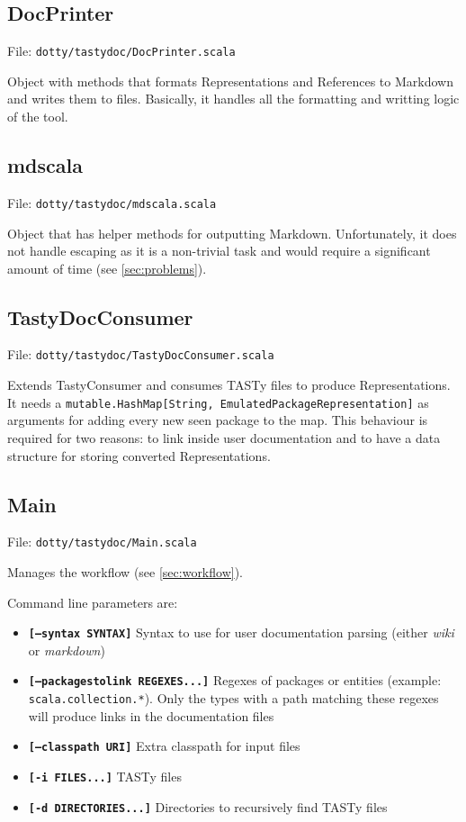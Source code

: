 \documentclass{report}
\begin{document}
\subsection{DocPrinter}
File: \texttt{dotty/tastydoc/DocPrinter.scala}

Object with methods that formats Representations and References to Markdown and writes them to files. Basically, it handles all the formatting and writting logic of the tool.

\subsection{mdscala}
File: \texttt{dotty/tastydoc/mdscala.scala}

Object that has helper methods for outputting Markdown. Unfortunately, it does not handle escaping as it is a non-trivial task and would require a significant amount of time (see \autoref{sec:problems}).

\subsection{TastyDocConsumer}
File: \texttt{dotty/tastydoc/TastyDocConsumer.scala}

Extends TastyConsumer and consumes TASTy files to produce Representations. It needs a \texttt{mutable.HashMap[String, EmulatedPackageRepresentation]} as arguments for adding every new seen package to the map. This behaviour is required for two reasons: to link inside user documentation and to have a data structure for storing converted Representations.
\subsection{Main}
File: \texttt{dotty/tastydoc/Main.scala}

Manages the workflow (see \autoref{sec:workflow}).

Command line parameters are:
\begin{itemize}
    \item \textbf{\texttt{[--syntax SYNTAX]}} Syntax to use for user documentation parsing (either \textit{wiki} or \textit{markdown})
    \item \textbf{\texttt{[--packagestolink REGEXES...]}} Regexes of packages or entities (example: \texttt{scala.collection.*}). Only the types with a path matching these regexes will produce links in the documentation files
    \item \textbf{\texttt{[--classpath URI]}} Extra classpath for input files
    \item \textbf{\texttt{[-i FILES...]}} TASTy files
    \item \textbf{\texttt{[-d DIRECTORIES...]}} Directories to recursively find TASTy files
\end{itemize}
\end{document}
